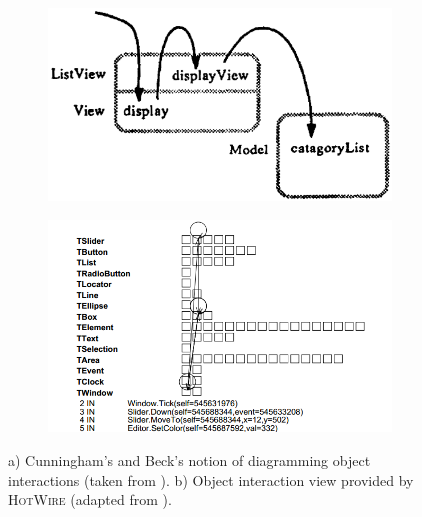 \begin{figure}[b]
	\centering
	
	\begin{subfigure}[b]{0.45\textwidth}
		\centering
        \includegraphics[width=\textwidth]{../images/06-Cunningham-Diagram}
        \caption[Object Interaction Diagrams by Cunningham and Beck]{}
		\label{fig:DebugCunningham}
	\end{subfigure}
	\quad
	\begin{subfigure}[b]{0.45\textwidth}
		\centering
		\includegraphics[width=\textwidth]{../images/06-Laffra-HotWire}
		\caption[Object Interaction View provided by \textsc{HotWire}]{}
		\label{fig:DebugLaffra}
	\end{subfigure}
	
	\caption[Debugging Object Interactions]{
		a) Cunningham's and Beck's notion of diagramming object interactions (taken from \cite{cunningham_diagram_1986}).
		b) Object interaction view provided by \textsc{HotWire} (adapted from \cite{laffra_hotwire:_1994}).
	}
\end{figure}

